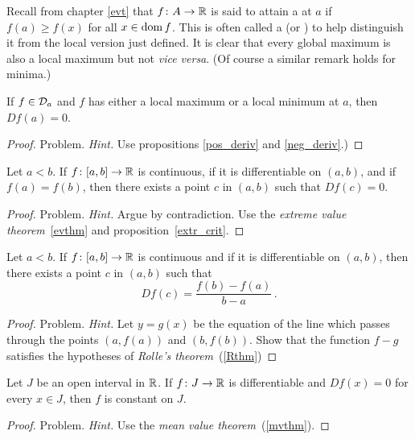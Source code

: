 \begin{prob}
\begin{defn}
Recall from chapter \ref{evt} that $f \colon A \rightarrow \mathbb{R}$ is said to attain a
 at $a$ if $f(a) \ge f(x)$ for all $x \in \operatorname{dom} f$.
This is often called a
 (or
)  to help distinguish it from the local version just defined. It is
clear that every global maximum is also a local maximum but not \emph{vice versa}. (Of course
a similar remark holds for minima.)
\end{defn}

\begin{prop}\label{extr_crit}  If $f \in \mathcal{D}_a$ and $f$ has either a local maximum or a
local minimum at $a$, then $Df(a) = 0$.
\end{prop}

\begin{proof} Problem. \emph{Hint.} Use propositions \ref{pos_deriv} and \ref{neg_deriv}.)
\ns  \end{proof}

%
\begin{prop}\label{Rthm} Let $a<b$. If $f \colon [a,b] \rightarrow \mathbb{R}$ is continuous,
if it is differentiable on $(a,b)$, and if $f(a) = f(b)$, then there exists a point $c$ in
$(a,b)$ such that $Df(c) = 0$.
\end{prop}

\begin{proof} Problem. \emph{Hint.} Argue by contradiction. Use the \emph{extreme value
theorem}~\ref{evthm} and proposition~\ref{extr_crit}.  \ns
\end{proof}

\begin{thm}\label{mvthm} Let $a < b$. If $f \colon [a,b] \rightarrow \mathbb{R}$ is continuous
and if it is differentiable on $(a,b)$, then there exists a point $c$ in $(a,b)$ such that
   \[ Df(c) = \frac{f(b) - f(a)}{b - a}\,. \]
\end{thm}

\begin{proof} Problem. \emph{Hint.} Let $y = g(x)$ be the equation of the line which passes through
the points $(a,f(a))$ and $(b,f(b))$. Show that the function $f - g$ satisfies the hypotheses
of \emph{Rolle's theorem}~(\ref{Rthm})  \ns
\end{proof}

\begin{prop} Let $J$ be an open interval in $\mathbb{R}$. If $f \colon J \rightarrow \mathbb{R}$ is differentiable and
$Df(x) = 0$ for every $x \in J$, then $f$ is constant on $J$.
\end{prop}

\begin{proof} Problem. \emph{Hint.} Use the \emph{mean value theorem}~(\ref{mvthm}). \ns
\end{proof}
\end{prob}



\endinput
